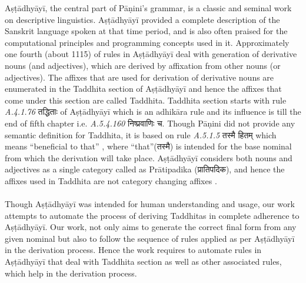 \documentclass[11pt]{article}
\begin{document}
Aṣṭādhyāyī, the central part of Pāṇini's grammar, is a classic and seminal work on descriptive linguistics. Aṣṭādhyāyī provided a complete description of the Sanskrit language spoken at that time period, and is also often praised for the computational principles and programming concepts used in it. Approximately one fourth (about 1115) of rules in Aṣṭādhyāyī deal with generation of derivative nouns (and adjectives), which are derived by affixation from other nouns (or adjectives). The affixes that are used for derivation of derivative nouns are enumerated in the Taddhita section of Aṣṭādhyāyī and hence the affixes that come under this section are called Taddhita. Taddhita section starts with rule {\sl A.4.1.76} { \skt तद्धिताः} of Aṣṭādhyāyī which is an adhikāra rule and its influence is till the end of fifth chapter i.e. {\sl A.5.4.160} {\skt निष्प्रवाणिः च}. Though Pāṇini did not provide any semantic definition for Taddhita, it is based on rule {\sl A.5.1.5} {\skt तस्मै हितम्} which means ``beneficial to that'' \cite{bhate89}, where ``that''({\skt तस्मै}) is intended for the base nominal from which the derivation will take place. Aṣṭādhyāyī considers both nouns and adjectives as a single category called as Prātipadika ({\skt प्रातिपदिक}), and hence the affixes used in Taddhita are not category changing affixes \cite{deo07}.
\\ \\
Though Aṣṭādhyāyī was intended for human understanding and usage, our work attempts to automate the process of deriving Taddhitas in complete adherence to Aṣṭādhyāyī. Our work, not only aims to generate the correct final form from any given nominal but also to follow the sequence of rules applied as per Aṣṭādhyāyī in the derivation process. Hence the work requires to automate rules in Aṣṭādhyāyī that deal with Taddhita section as well as other associated rules, which help in the derivation process.
\\
\end{document}
